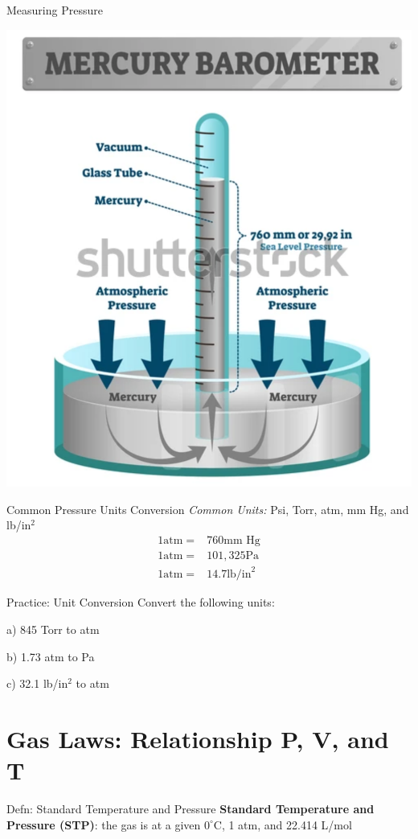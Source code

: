 \documentclass[11pt]{beamer}
\begin{document}
\begin{frame}{Measuring Pressure}
  \begin{center}
    \includegraphics[width=0.6\linewidth]{merc_baro}
  \end{center}
\end{frame}

\begin{frame}{Common Pressure Units Conversion}
  \textit{Common Units:} Psi, Torr, atm, mm Hg, and lb/in$^2$
  \begin{align*}
    1 \text{atm} = & 760 \text{mm Hg} \\
    1 \text{atm} = & 101,325 \text{Pa} \\
    1 \text{atm} = & 14.7 \text{lb/in}^2
  \end{align*}
\end{frame}

\begin{frame}{Practice: Unit Conversion}
  Convert the following units:

  a) 845 Torr to atm

  b) 1.73 atm to Pa

  c) 32.1 lb/in$^2$ to atm

  \vspace{1in}
\end{frame}

\section{Gas Laws: Relationship P, V, and T}

\begin{frame}{Defn: Standard Temperature and Pressure}
  \textbf{Standard Temperature and Pressure (STP)}: the gas is at
  a given $0^\circ$C, 1 atm, and 22.414 L/mol
\end{frame}
\end{document}
